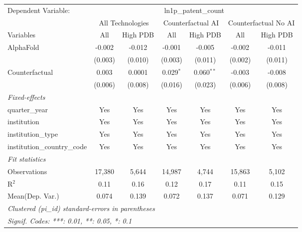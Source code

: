 \begingroup
\centering
\begin{tabular}{lcccccc}
   \tabularnewline \midrule \midrule
   Dependent Variable: & \multicolumn{6}{c}{ln1p\_patent\_count}\\
 & \multicolumn{2}{c}{All Technologies} & \multicolumn{2}{c}{Counterfactual AI} & \multicolumn{2}{c}{Counterfactual No AI} \\
\cmidrule(lr){1-1}\cmidrule(lr){2-3} \cmidrule(lr){4-5} \cmidrule(lr){6-7}
Variables & \multicolumn{1}{c}{All} & \multicolumn{1}{c}{High PDB} & \multicolumn{1}{c}{All} & \multicolumn{1}{c}{High PDB} & \multicolumn{1}{c}{All} & \multicolumn{1}{c}{High PDB} \\
\cmidrule(lr){1-1}\cmidrule(lr){2-2} \cmidrule(lr){3-3} \cmidrule(lr){4-4} \cmidrule(lr){5-5} \cmidrule(lr){6-6} \cmidrule(lr){7-7}
   AlphaFold                    & -0.002  & -0.012  & -0.001      & -0.005       & -0.002  & -0.011\\   
                                & (0.003) & (0.010) & (0.003)     & (0.011)      & (0.002) & (0.011)\\   
   Counterfactual               & 0.003   & 0.0001  & 0.029$^{*}$ & 0.060$^{**}$ & -0.003  & -0.008\\   
                                & (0.006) & (0.008) & (0.016)     & (0.023)      & (0.006) & (0.008)\\   
   \midrule
   \emph{Fixed-effects}\\
   quarter\_year                & Yes     & Yes     & Yes         & Yes          & Yes     & Yes\\  
   institution                  & Yes     & Yes     & Yes         & Yes          & Yes     & Yes\\  
   institution\_type            & Yes     & Yes     & Yes         & Yes          & Yes     & Yes\\  
   institution\_country\_code   & Yes     & Yes     & Yes         & Yes          & Yes     & Yes\\  
   \midrule
   \emph{Fit statistics}\\
   Observations                 & 17,380  & 5,644   & 14,987      & 4,744        & 15,863  & 5,102\\  
   R$^2$                        & 0.11    & 0.16    & 0.12        & 0.17         & 0.11    & 0.15\\  
Mean(Dep. Var.) & 0.074 & 0.139 & 0.072 & 0.137 & 0.071 & 0.129 \\
   \midrule \midrule
   \multicolumn{7}{l}{\emph{Clustered (pi\_id) standard-errors in parentheses}}\\
   \multicolumn{7}{l}{\emph{Signif. Codes: ***: 0.01, **: 0.05, *: 0.1}}\\
\end{tabular}
\par\endgroup
